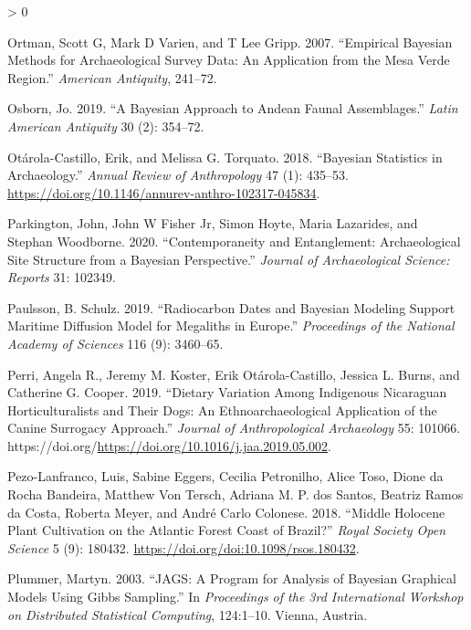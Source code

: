 \documentclass[
]{article}
\newlength{\cslhangindent}
\newenvironment{CSLReferences}[2] %
 {%
  \setlength{\parindent}{0pt}
  \ifodd #1 \everypar{\setlength{\hangindent}{\cslhangindent}}\ignorespaces\fi
  \ifnum #2 > 0
  \setlength{\parskip}{#2\baselineskip}
  \fi
 }%
 {}
\begin{document}
\begin{CSLReferences}{1}{0}
\leavevmode\hypertarget{ref-ortman_empirical_2007}{}%
Ortman, Scott G, Mark D Varien, and T Lee Gripp. 2007. {``Empirical
{Bayesian} Methods for Archaeological Survey Data: {An} Application from
the {Mesa} {Verde} Region.''} \emph{American Antiquity}, 241--72.

\leavevmode\hypertarget{ref-osborn_bayesian_2019}{}%
Osborn, Jo. 2019. {``A {Bayesian} {Approach} to {Andean} {Faunal}
{Assemblages}.''} \emph{Latin American Antiquity} 30 (2): 354--72.

\leavevmode\hypertarget{ref-otarola-castillo_bayesian_2018}{}%
Otárola-Castillo, Erik, and Melissa G. Torquato. 2018. {``Bayesian
{Statistics} in {Archaeology}.''} \emph{Annual Review of Anthropology}
47 (1): 435--53.
\url{https://doi.org/10.1146/annurev-anthro-102317-045834}.

\leavevmode\hypertarget{ref-parkington_contemporaneity_2020}{}%
Parkington, John, John W Fisher Jr, Simon Hoyte, Maria Lazarides, and
Stephan Woodborne. 2020. {``Contemporaneity and Entanglement:
{Archaeological} Site Structure from a {Bayesian} Perspective.''}
\emph{Journal of Archaeological Science: Reports} 31: 102349.

\leavevmode\hypertarget{ref-paulsson_radiocarbon_2019}{}%
Paulsson, B. Schulz. 2019. {``Radiocarbon Dates and {Bayesian} Modeling
Support Maritime Diffusion Model for Megaliths in {Europe}.''}
\emph{Proceedings of the National Academy of Sciences} 116 (9):
3460--65.

\leavevmode\hypertarget{ref-perri_dietary_2019}{}%
Perri, Angela R., Jeremy M. Koster, Erik Otárola-Castillo, Jessica L.
Burns, and Catherine G. Cooper. 2019. {``Dietary Variation Among
Indigenous {Nicaraguan} Horticulturalists and Their Dogs: {An}
Ethnoarchaeological Application of the {Canine} {Surrogacy}
{Approach}.''} \emph{Journal of Anthropological Archaeology} 55: 101066.
https://doi.org/\url{https://doi.org/10.1016/j.jaa.2019.05.002}.

\leavevmode\hypertarget{ref-pezo-lanfranco_middle_2018}{}%
Pezo-Lanfranco, Luis, Sabine Eggers, Cecilia Petronilho, Alice Toso,
Dione da Rocha Bandeira, Matthew Von Tersch, Adriana M. P. dos Santos,
Beatriz Ramos da Costa, Roberta Meyer, and André Carlo Colonese. 2018.
{``Middle {Holocene} Plant Cultivation on the {Atlantic} {Forest} Coast
of {Brazil}?''} \emph{Royal Society Open Science} 5 (9): 180432.
\url{https://doi.org/doi:10.1098/rsos.180432}.

\leavevmode\hypertarget{ref-plummer_jags_2003}{}%
Plummer, Martyn. 2003. {``{JAGS}: {A} Program for Analysis of {Bayesian}
Graphical Models Using {Gibbs} Sampling.''} In \emph{Proceedings of the
3rd International Workshop on Distributed Statistical Computing},
124:1--10. Vienna, Austria.


\end{CSLReferences}
\end{document}
